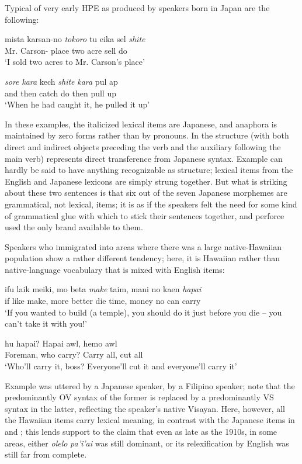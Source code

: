 Typical of very early HPE as produced by speakers born in Japan are the following:

\ea\label{ex:1}
 \gll mista karsan-no \emph{to}\emph{k}\emph{oro} tu eika sel \emph{shite}\\
  Mr. {Carson-\POSS} place two acre sell do \\
\glt  `I sold two acres to Mr. Carson's place'
\z

\ea\label{ex:2}
 \gll \emph{sore} \emph{kara} kech \emph{shite} \emph{kara} pul ap \\
and then catch do then pull up\\
\glt  `When he had caught it, he pulled it up'
\z


\noindent In these examples, the italicized lexical items are Japanese, and ana\-phora is maintained by zero forms rather than by pronouns. In  the structure (with both direct and indirect objects preceding the verb and the auxiliary following the main verb) represents direct transference from Japanese syntax. Example  can hardly be said to have anything recognizable as structure; lexical items from the English and Japanese lexicons are simply strung together. But what is striking about these two sentences is that six out of the seven Japanese morphemes are grammatical, not lexical, items; it is as if the speakers felt the need for some kind of grammatical glue with which to stick their sentences together, and perforce used the only brand available to them.

Speakers who immigrated into areas where there was a large native-Hawaiian population show a rather different tendency; here, it is Hawaiian rather than native-language vocabulary that is mixed with English items:

\ea\label{ex:3}
 \gll ifu laik meiki, mo beta \emph{make} taim, mani no kaen \emph{hapai} \\
if like make, more better die time, money no can carry \\
\glt  `If you wanted to build (a temple), you should do it just before you die -- you can't take it with you!'
\z

\ea\label{ex:4}
 hu {hapai?} {Hapai} awl, {hemo} awl\\
 Foreman, who {carry?} Carry all, cut all\\
\glt  `Who'll carry it, boss? Everyone'll cut it and everyone'll carry it'
\z

\noindent Example  was uttered by a Japanese speaker,  by a Filipino speaker; note that the predominantly OV syntax of the former is replaced by a predominantly VS syntax in the latter, reflecting the speaker's native Visayan. Here, however, all the Hawaiian items carry lexical meaning, in contrast with the Japanese items in  and ; this lends support to the claim that even as late as the 1910s, in some areas, either \textit{olelo} \textit{pa'i'ai} was still dominant, or its relexification by English was still far from complete.

